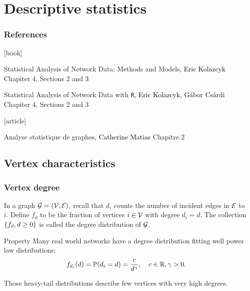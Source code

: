 \documentclass{beamer}\usepackage[]{graphicx}\usepackage[]{color}
\begin{document}
\section{Descriptive statistics}

\begin{frame} 
  \frametitle{References}

    \begin{thebibliography}{99}
      [book]

     Statistical Analysis of Network Data: Methods and Models, 
    \newblock \textcolor{black}{Eric Kolazcyk}
    \newblock \alert{Chapiter 4, Sections 2 and 3}

     Statistical Analysis of Network Data with \texttt{R}, 
    \newblock \textcolor{black}{Eric Kolazcyk, G\'abor Cs\'ardi}
    \newblock \alert{Chapiter 4, Sections 2 and 3}

      [article]

     Analyse statistique de graphes, 
    \newblock \textcolor{black}{Catherine Matias}
    \newblock \alert{Chapitre 2}

    \end{thebibliography}

\end{frame}

\subsection{Vertex characteristics}

\begin{frame}
  \frametitle{Vertex degree}
  
  \begin{definition}
    In a graph $\mathcal{G} = (\mathcal{V}, \mathcal{E})$, recall that $d_i$ counts the number of incident edges in $\mathcal{E}$ to $i$. Define $f_d$ to be
    the fraction of vertices $i\in \mathcal{V}$ with degree $d_i=d$. The collection $\left\{f_d, d\geq 0\right\}$ is called the \alert{degree distribution} of $\mathcal{G}$.
  \end{definition}
  
  \begin{block}{Property}
    Many real world networks have a degree distribution fitting well power law distributions: 
    \[
      f_{d_i}(d) = \mathbb{P}(d_i = d) = \frac{c}{d^\gamma}, \quad c\in\mathbb{R}, \gamma > 0.
    \]
  \end{block}
  Those heavy-tail distributions describe few vertices with very high degrees.
\end{frame}
\end{document}
